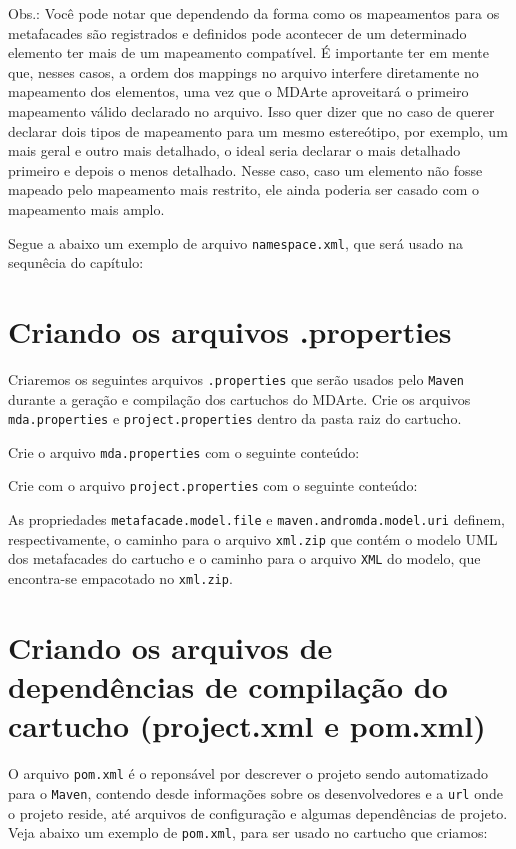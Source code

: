 Obs.: Você pode notar que dependendo da forma como os mapeamentos para os
metafacades são registrados e definidos pode acontecer de um determinado
elemento ter mais de um mapeamento compatível. É importante ter em mente que,
nesses casos, a ordem dos mappings no arquivo interfere diretamente no
mapeamento dos elementos, uma vez que o MDArte aproveitará o primeiro mapeamento
válido declarado no arquivo. Isso quer dizer que no caso de querer declarar dois
tipos de mapeamento para um mesmo estereótipo, por exemplo, um mais geral e
outro mais detalhado, o ideal seria declarar o mais detalhado primeiro e depois
o menos detalhado. Nesse caso, caso um elemento não fosse mapeado pelo
mapeamento mais restrito, ele ainda poderia ser casado com o mapeamento mais
amplo.

Segue a abaixo um exemplo de arquivo \texttt{namespace.xml}, que será usado na
sequnêcia do capítulo:



\section{Criando os arquivos .properties}
Criaremos os seguintes arquivos \texttt{.properties} que serão usados pelo
\texttt{Maven} durante a geração e compilação dos cartuchos do MDArte. Crie os
arquivos \texttt{mda.properties} e \texttt{project.properties} dentro da pasta
raiz do cartucho.

Crie o arquivo \texttt{mda.properties} com o seguinte conteúdo:



Crie com o arquivo \texttt{project.properties} com o seguinte conteúdo:



As propriedades \texttt{metafacade.model.file} e
\texttt{maven.andromda.model.uri} definem, respectivamente, o caminho para o
arquivo \texttt{xml.zip} que contém o modelo UML dos metafacades do cartucho e o
caminho para o arquivo \texttt{XML} do modelo, que encontra-se empacotado no
\texttt{xml.zip}.

\section{Criando os arquivos de dependências de compilação do cartucho
(project.xml e pom.xml)}
O arquivo \texttt{pom.xml} é o reponsável por descrever o projeto sendo
automatizado para o \texttt{Maven}, contendo desde informações sobre os
desenvolvedores e a \texttt{url} onde o projeto reside, até arquivos de
configuração e algumas dependências de projeto. Veja abaixo um exemplo de
\texttt{pom.xml}, para ser usado no cartucho que criamos:

